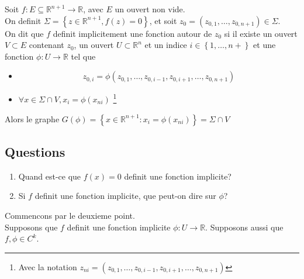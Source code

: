 \documentclass[../main.tex]{subfiles}
\begin{document}
\begin{defn}
	Soit $f: E \subseteq \mathbb{R}^{n+1} \to \mathbb{R}$, avec $E$ un ouvert non vide.\\
	On definit $\Sigma = \left\{ z \in \mathbb{R}^{n+1}, f( z) =0 \right\} $, et soit $z_0= ( z_{0,1},\ldots, z_{0,n+1} ) \in \Sigma$.\\
	On dit que $f$ definit implicitement une fonction autour de $z_0$ si il existe un ouvert $V \subset E$ contenant $z_0$, un ouvert $U \subset \mathbb{R}^n$ et un indice $i \in \left\{ 1,\ldots,n+ \right\} $ et une fonction $\phi: U \to \mathbb{R}$ tel que
	\begin{itemize}
	\item 
	\[ 
		z_{0,i} = \phi( z_{0,1} ,\ldots, z_{0,i-1} , z_{0,i+1} , \ldots, z_{0,n+1} ) 
	\]

\item $ \forall x \in \Sigma \cap V, x_i = \phi( x_{ni} ) $ \footnote { Avec la notation $z_{ni}= (  z_{0,1} ,\ldots, z_{0,i-1} , z_{0,i+1} , \ldots, z_{0,n+1}) $ } 
	\end{itemize}
	Alors le graphe $G( \phi) = \left\{ x \in \mathbb{R}^{n+1}: x_{i} = \phi( x_{ni} )  \right\} = \Sigma\cap V$
	
\end{defn}
\subsection*{Questions}
\begin{enumerate}
	\item Quand est-ce que $f( x) = 0$ definit une fonction implicite?
	\item Si $f$ definit une fonction implicite, que peut-on dire sur $\phi$?
\end{enumerate}
Commencons par le deuxieme point.\\
Supposons que $f$ definit une fonction implicite $\phi: U \to \mathbb{R}$. Supposons aussi que $f,\phi \in C^{k}$.\\
\end{document}
